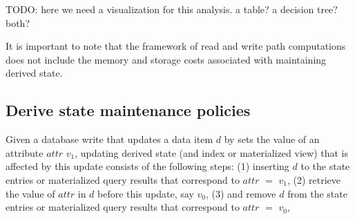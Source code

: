 TODO: here we need a visualization for this analysis. a table? a decision tree? both?

It is important to note that the framework of read and write path computations does not include the memory and storage
costs associated with maintaining derived state.






\subsection{Derive state maintenance policies}
\label{sec:sync_async_maintenance}

Given a database write that updates a data item $d$ by sets the value of an attribute $attr$ $v_1$,
updating derived state (and index or materialized view) that is affected by this update consists of the following steps:
(1) inserting $d$ to the state entries or materialized query results that correspond to $attr$ $=$ $v_1$,
(2) retrieve the value of $attr$ in $d$ before this update, say $v_0$,
(3) and remove $d$ from the state entries or materialized query results that correspond to $attr$ $=$ $v_0$,

